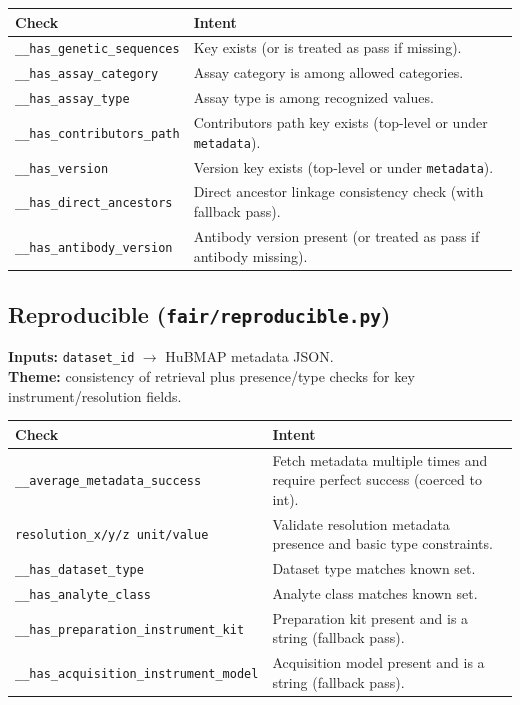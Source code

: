 \documentclass[11pt]{article}
\begin{document}
\begin{center}
\begin{tabular}{@{}p{}p{}@{}}
\toprule
\textbf{Check} & \textbf{Intent} \\
\midrule
\texttt{\_\_has\_genetic\_sequences} & Key exists (or is treated as pass if missing). \\
\texttt{\_\_has\_assay\_category} & Assay category is among allowed categories. \\
\texttt{\_\_has\_assay\_type} & Assay type is among recognized values. \\
\texttt{\_\_has\_contributors\_path} & Contributors path key exists (top-level or under \texttt{metadata}). \\
\texttt{\_\_has\_version} & Version key exists (top-level or under \texttt{metadata}). \\
\texttt{\_\_has\_direct\_ancestors} & Direct ancestor linkage consistency check (with fallback pass). \\
\texttt{\_\_has\_antibody\_version} & Antibody version present (or treated as pass if antibody missing). \\
\bottomrule
\end{tabular}
\end{center}

\subsection{Reproducible (\texttt{fair/reproducible.py})}
\textbf{Inputs:} \texttt{dataset\_id} \(\rightarrow\) HuBMAP metadata JSON.\\
\textbf{Theme:} consistency of retrieval plus presence/type checks for key instrument/resolution fields.

\begin{center}
\begin{tabular}{@{}p{}p{}@{}}
\toprule
\textbf{Check} & \textbf{Intent} \\
\midrule
\texttt{\_\_average\_metadata\_success} & Fetch metadata multiple times and require perfect success (coerced to int). \\
\texttt{resolution\_x/y/z unit/value} & Validate resolution metadata presence and basic type constraints. \\
\texttt{\_\_has\_dataset\_type} & Dataset type matches known set. \\
\texttt{\_\_has\_analyte\_class} & Analyte class matches known set. \\
\texttt{\_\_has\_preparation\_instrument\_kit} & Preparation kit present and is a string (fallback pass). \\
\texttt{\_\_has\_acquisition\_instrument\_model} & Acquisition model present and is a string (fallback pass). \\
\bottomrule
\end{tabular}
\end{center}
\end{document}
